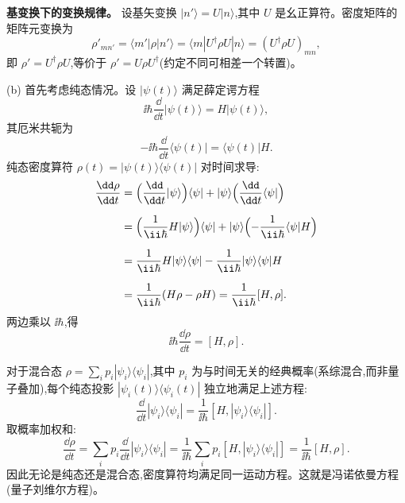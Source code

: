 \begin{question}
\begin{solution}
\textbf{基变换下的变换规律。}
设基矢变换 $|n'\rangle = U|n\rangle$,其中 $U$ 是幺正算符。密度矩阵的矩阵元变换为
\[
\rho'_{mn'} = \langle m'|\rho|n'\rangle = \langle m|U^\dagger\rho U|n\rangle = (U^\dagger\rho U)_{mn},
\]
即 $\rho' = U^\dagger\rho U$,等价于 $\rho' = U\rho U^\dagger$(约定不同可相差一个转置)。

(b) 首先考虑纯态情况。设 $|\psi(t)\rangle$ 满足薛定谔方程
\[
\ii\hbar\frac{\dd}{\dd t}|\psi(t)\rangle = H|\psi(t)\rangle,
\]
其厄米共轭为
\[
-\ii\hbar\frac{\dd}{\dd t}\langle\psi(t)| = \langle\psi(t)|H.
\]
纯态密度算符 $\rho(t)=|\psi(t)\rangle\langle\psi(t)|$ 对时间求导:
\[
\begin{aligned}
\frac{\dd\rho}{\dd t}
&= \Bigl(\frac{\dd}{\dd t}|\psi\rangle\Bigr)\langle\psi| + |\psi\rangle\Bigl(\frac{\dd}{\dd t}\langle\psi|\Bigr)\\[2mm]
&= \Bigl(\frac{1}{\ii\hbar}H|\psi\rangle\Bigr)\langle\psi| + |\psi\rangle\Bigl(-\frac{1}{\ii\hbar}\langle\psi|H\Bigr)\\[2mm]
&= \frac{1}{\ii\hbar} H|\psi\rangle\langle\psi| - \frac{1}{\ii\hbar} |\psi\rangle\langle\psi|H \\[2mm]
&= \frac{1}{\ii\hbar}(H\rho - \rho H) = \frac{1}{\ii\hbar}[H,\rho].
\end{aligned}
\]
两边乘以 $\ii\hbar$,得
\[
\boxed{\ii\hbar\frac{\dd\rho}{\dd t} = [H,\rho].}
\]

对于混合态 $\rho = \sum_i p_i |\psi_i\rangle\langle\psi_i|$,其中 $p_i$ 为与时间无关的经典概率(系综混合,而非量子叠加),每个纯态投影 $|\psi_i(t)\rangle\langle\psi_i(t)|$ 独立地满足上述方程:
\[
\frac{\dd}{\dd t}|\psi_i\rangle\langle\psi_i| = \frac{1}{\ii\hbar}[H,|\psi_i\rangle\langle\psi_i|].
\]
取概率加权和:
\[
\frac{\dd\rho}{\dd t} = \sum_i p_i\frac{\dd}{\dd t}|\psi_i\rangle\langle\psi_i|
= \frac{1}{\ii\hbar}\sum_i p_i [H,|\psi_i\rangle\langle\psi_i|]
= \frac{1}{\ii\hbar}[H,\rho].
\]
因此无论是纯态还是混合态,密度算符均满足同一运动方程。这就是冯诺依曼方程(量子刘维尔方程)。
\end{solution}
\end{question}


